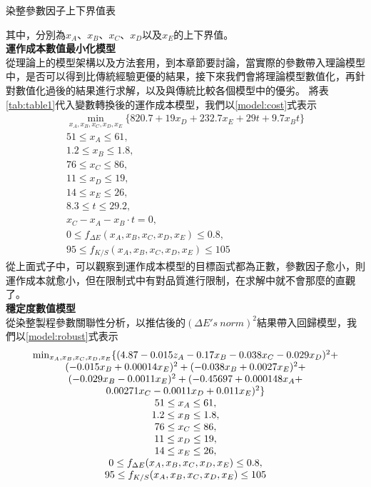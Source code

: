 \begin{table}
	\caption{染整參數因子上下界值表}
	\center
	
	\label{tab:table2}
\end{table}
其中，分別為$x_A$、$x_B$、$x_C$、$x_D$以及$x_E$的上下界值。
\\ \textbf{運作成本數值最小化模型}\\
從理論上的模型架構以及方法套用，到本章節要討論，當實際的參數帶入理論模型中，是否可以得到比傳統經驗更優的結果，接下來我們會將理論模型數值化，再針對數值化過後的結果進行求解，以及與傳統比較各個模型中的優劣。
將表\ref{tab:table1}代入變數轉換後的運作成本模型，我們以\ref{model:cost}式表示
	\begin{equation}
	\begin{array}{c}
	\min_{x_A,x_B,x_C,x_D,x_E} \{ 820.7+19x_D+232.7x_E+29t+9.7x_Bt \} \\
	51 \leq x_A \leq 61,\\
	1.2 \leq x_B \leq 1.8,\\
	76 \leq x_C \leq 86,\\
	11 \leq x_D \leq 19,\\
	14 \leq x_E \leq 26,\\
	8.3 \leq t \leq 29.2,\\
	x_C-x_A-x_B\cdot t = 0,\\
	0 \leq f_{\Delta E}(x_A,x_B,x_C,x_D,x_E) \leq 0.8,\\
	95 \leq f_{K/S}(x_A,x_B,x_C,x_D,x_E) \leq 105
	\end{array}
	\label{model:cost}
\end{equation}
從上面式子中，可以觀察到運作成本模型的目標函式都為正數，參數因子愈小，則運作成本就愈小，但在限制式中有對品質進行限制，在求解中就不會那麼的直觀了。
\\ \textbf{穩定度數值模型}\\
從染整製程參數關聯性分析，以推估後的$(\Delta E's\ norm)^2$結果帶入回歸模型，我們以\ref{model:robust}式表示
\begin{equation}
	\begin{array}{c}
	\min_{x_A,x_B,x_C,x_D,x_E} \{ 
	(4.87-0.015z_A-0.17x_B-0.038x_C-0.029x_D)^2+\\
	(-0.015x_B+0.00014x_E)^2+(-0.038x_B+0.0027x_E)^2+\\
	(-0.029x_B-0.0011x_E)^2+(-0.45697+0.000148x_A+\\
	0.00271x_C-0.0011x_D+0.011x_E)^2 \} \\
	51 \leq x_A \leq 61,\\
	1.2 \leq x_B \leq 1.8,\\
	76 \leq x_C \leq 86,\\
	11 \leq x_D \leq 19,\\
	14 \leq x_E \leq 26,\\
	0 \leq f_{\Delta E}(x_A,x_B,x_C,x_D,x_E) \leq 0.8,\\
	95 \leq f_{K/S}(x_A,x_B,x_C,x_D,x_E) \leq 105
	\end{array}
	\label{model:robust}
	\hfill
\end{equation}
